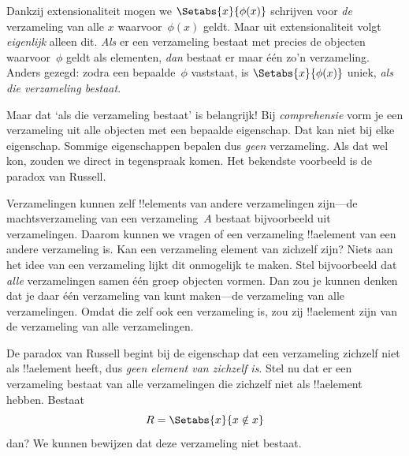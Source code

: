 \documentclass[openany]{memoir}
\begin{document}
\begingroup
\def\olfilename{OLP-0010}
\def\olfilepath{content/sets-functions-relations/sets/}
\hypertarget{unit-OLP-0010}{}





Dankzij extensionaliteit mogen we $\Setabs{x}{\phi(x)}$ schrijven voor
\emph{de} verzameling van alle $x$ waarvoor~$\phi(x)$ geldt. Maar uit
extensionaliteit volgt \emph{eigenlijk} alleen dit. \emph{Als} er een
verzameling bestaat met precies de objecten waarvoor~$\phi$ geldt als
elementen, \emph{dan} bestaat er maar één zo'n verzameling. Anders
gezegd: zodra een bepaalde~$\phi$ vaststaat, is
$\Setabs{x}{\phi(x)}$ uniek, \emph{als die verzameling bestaat}.

Maar dat ‘als die verzameling bestaat’ is belangrijk!{} Bij
\emph{comprehensie} vorm je een verzameling uit alle objecten met een
bepaalde eigenschap. Dat kan niet bij elke eigenschap. Sommige
eigenschappen bepalen dus \emph{geen} verzameling. Als dat wel kon,
zouden we direct in tegenspraak komen. Het bekendste voorbeeld is de
paradox van Russell.

Verzamelingen kunnen zelf !!{element}s van andere verzamelingen
zijn---de machtsverzameling van een verzameling~$A$ bestaat
bijvoorbeeld uit verzamelingen. Daarom kunnen we vragen of een
verzameling !!a{element} van een andere verzameling is. Kan een
verzameling element van zichzelf zijn? Niets aan het idee van een
verzameling lijkt dit onmogelijk te maken. Stel bijvoorbeeld dat
\emph{alle} verzamelingen samen één groep objecten vormen. Dan zou je
kunnen denken dat je daar één verzameling van kunt maken---de
verzameling van alle verzamelingen. Omdat die zelf ook een verzameling
is, zou zij !!a{element} zijn van de verzameling van alle
verzamelingen.

De paradox van Russell begint bij de eigenschap dat een verzameling
zichzelf niet als !!a{element} heeft, dus \emph{geen element van
zichzelf is}. Stel nu dat er een verzameling bestaat van alle
verzamelingen die zichzelf niet als !!a{element} hebben. Bestaat
\[
R = \Setabs{x}{x \notin x}
\]
dan? We kunnen bewijzen dat deze verzameling niet bestaat.
\end{document}
